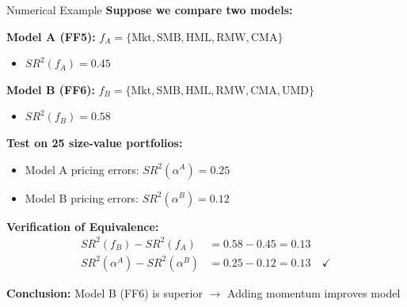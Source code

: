 \documentclass{beamer}
\begin{document}
\begin{frame}{Numerical Example}
    \textbf{Suppose we compare two models:}
    
    
    \textbf{Model A (FF5):} $f_A = \{\text{Mkt}, \text{SMB}, \text{HML}, \text{RMW}, \text{CMA}\}$
    \begin{itemize}
        \item $SR^2(f_A) = 0.45$
    \end{itemize}
    
    \textbf{Model B (FF6):} $f_B = \{\text{Mkt}, \text{SMB}, \text{HML}, \text{RMW}, \text{CMA}, \text{UMD}\}$
    \begin{itemize}
        \item $SR^2(f_B) = 0.58$
    \end{itemize}
    
    \vspace{0.3cm}
    \textbf{Test on 25 size-value portfolios:}
    \begin{itemize}
        \item Model A pricing errors: $SR^2(\alpha^A) = 0.25$
        \item Model B pricing errors: $SR^2(\alpha^B) = 0.12$
    \end{itemize}
    
    \vspace{0.3cm}
    \textbf{Verification of Equivalence:}
    \begin{align*}
        SR^2(f_B) - SR^2(f_A) &= 0.58 - 0.45 = 0.13 \\
        SR^2(\alpha^A) - SR^2(\alpha^B) &= 0.25 - 0.12 = 0.13 \quad \checkmark
    \end{align*}
    
    
    \textbf{Conclusion:} Model B (FF6) is superior $\rightarrow$ Adding momentum improves model
\end{frame}
\end{document}
